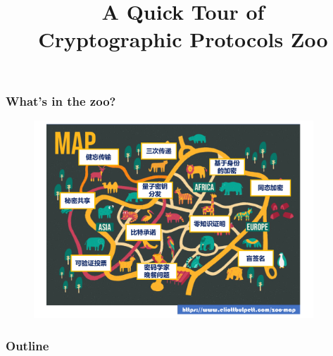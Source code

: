 

\title{A Quick Tour of \\ Cryptographic Protocols Zoo}


\maketitle
\begin{frame}\frametitle{What's in the zoo?}
\begin{figure}
\begin{center}
%
\includegraphics[width=105mm]{pic/zoo-cn.pdf} 
\end{center}
\end{figure}
\end{frame}
\begin{frame}
\frametitle{Outline}
\tableofcontents
\end{frame}

